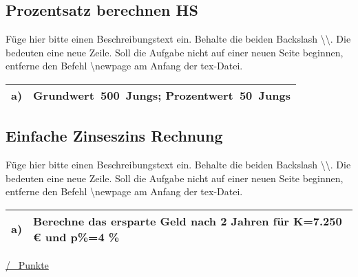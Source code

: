 \subsection{Prozentsatz berechnen HS}
Füge hier bitte einen Beschreibungstext ein. Behalte die beiden Backslash \textbackslash\textbackslash. Die bedeuten eine neue Zeile. Soll die Aufgabe nicht auf einer neuen Seite beginnen, entferne den Befehl \textbackslash newpage am Anfang der tex-Datei.\\
\begin{xltabular}{\textwidth}{|C{0.75cm}|X|}
\hline
a)&Grundwert~500~Jungs;  Prozentwert~50~Jungs
\\\hline
\end{xltabular}
\vspace{0.5cm}
\subsection{Einfache Zinseszins Rechnung}
Füge hier bitte einen Beschreibungstext ein. Behalte die beiden Backslash \textbackslash\textbackslash. Die bedeuten eine neue Zeile. Soll die Aufgabe nicht auf einer neuen Seite beginnen, entferne den Befehl \textbackslash newpage am Anfang der tex-Datei.\\
\begin{xltabular}{\textwidth}{|C{0.75cm}|X|}
\hline
a)&Berechne das ersparte Geld nach 2 Jahren für K=7.250 € und p\%=4 \%
\\\hline
\end{xltabular}
\vspace{0.5cm}
\begin{flushright}
\underline{\hspace{2cm}/ \punkte~Punkte}
\end{flushright}
